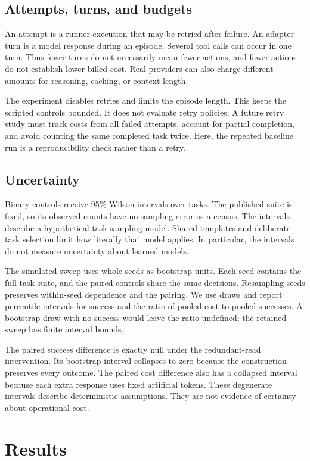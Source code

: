\documentclass{article}
\begin{document}
\subsection{Attempts, turns, and budgets}
An attempt is a runner execution that may be retried after failure. An adapter turn is a model response during an episode. Several tool calls can occur in one turn. Thus fewer turns do not necessarily mean fewer actions, and fewer actions do not establish lower billed cost. Real providers can also charge different amounts for reasoning, caching, or context length.\par
The experiment disables retries and limits the episode length. This keeps the scripted controls bounded. It does not evaluate retry policies. A future retry study must track costs from all failed attempts, account for partial completion, and avoid counting the same completed task twice. Here, the repeated baseline run is a reproducibility check rather than a retry.\par
\subsection{Uncertainty}
Binary controls receive 95\% Wilson intervals over tasks. The published suite is fixed, so its observed counts have no sampling error as a census. The intervals describe a hypothetical task-sampling model. Shared templates and deliberate task selection limit how literally that model applies. In particular, the intervals do not measure uncertainty about learned models.\par
The simulated sweep uses whole seeds as bootstrap units. Each seed contains the full task suite, and the paired controls share the same decisions. Resampling seeds preserves within-seed dependence and the pairing. We use \DrawCount{} draws and report percentile intervals for success and the ratio of pooled cost to pooled successes. A bootstrap draw with no success would leave the ratio undefined; the retained sweep has finite interval bounds.\par
The paired success difference is exactly null under the redundant-read intervention. Its bootstrap interval collapses to zero because the construction preserves every outcome. The paired cost difference also has a collapsed interval because each extra response uses fixed artificial tokens. These degenerate intervals describe deterministic assumptions. They are not evidence of certainty about operational cost.\par
\section{Results}
\end{document}
